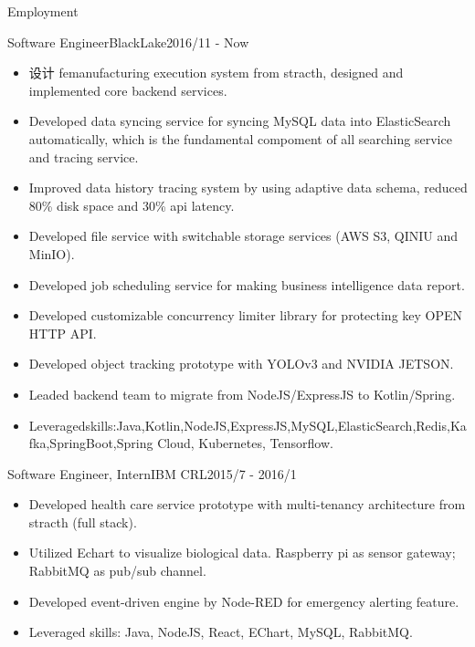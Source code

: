 \documentclass[]{minhuacv}
\begin{document}
	\makeheader
	
	\begin{cvsection}{Employment}
		\begin{cvsubsection}{Software Engineer}{BlackLake}{2016/11 - Now}
			\begin{itemize}
				\item 设计 femanufacturing execution system from stracth, designed and implemented core backend services.
				\item Developed data syncing service for syncing MySQL data into ElasticSearch automatically, which is the fundamental compoment of all searching service and tracing service.
				\item Improved data history tracing system by using adaptive data schema, reduced 80\% disk space and 30\% api latency.
				\item Developed file service with switchable storage services (AWS S3, QINIU and MinIO).
				\item Developed job scheduling service for making business intelligence data report.
				\item Developed customizable concurrency limiter library for protecting key OPEN HTTP API.
				\item Developed object tracking prototype with YOLOv3 and NVIDIA JETSON.
				\item Leaded backend team to migrate from NodeJS/ExpressJS to Kotlin/Spring.
				\item Leveragedskills:Java,Kotlin,NodeJS,ExpressJS,MySQL,ElasticSearch,Redis,Kafka,SpringBoot,Spring Cloud, Kubernetes, Tensorflow.
			\end{itemize}
		\end{cvsubsection}
		
		\begin{cvsubsection}{Software Engineer, Intern}{IBM CRL}{2015/7 - 2016/1}	
			\begin{itemize}
				\item Developed health care service prototype with multi-tenancy architecture from stracth (full stack).
				\item Utilized Echart to visualize biological data. Raspberry pi as sensor gateway; RabbitMQ as pub/sub channel.
				\item Developed event-driven engine by Node-RED for emergency alerting feature.
				\item Leveraged skills: Java, NodeJS, React, EChart, MySQL, RabbitMQ.
			\end{itemize}
		\end{cvsubsection}
		

\end{cvsection}
\end{document}
